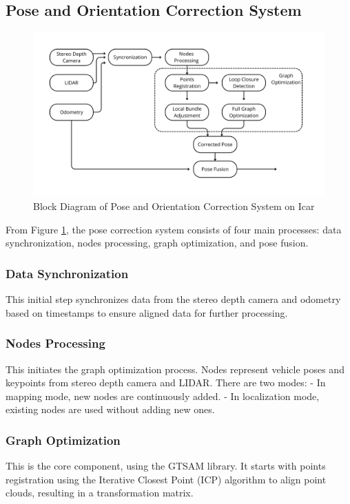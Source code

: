 \documentclass[conference]{IEEEtran}
\begin{document}
\subsection{Pose and Orientation Correction System}
\begin{figure}[H]
	\centering
	\includegraphics[width=\linewidth]{../konten/slam_sys3.png}
	\caption{Block Diagram of Pose and Orientation Correction System on Icar}
	\label{fig:slam_system}
\end{figure} 

From Figure \ref{fig:slam_system}, the pose correction system consists of four main processes: data synchronization, nodes processing, graph optimization, and pose fusion.

\subsubsection{Data Synchronization} 
This initial step synchronizes data from the stereo depth camera and odometry based on timestamps to ensure aligned data for further processing.

\subsubsection{Nodes Processing}
This initiates the graph optimization process. Nodes represent vehicle poses and keypoints from stereo depth camera and LIDAR. There are two modes:
- In mapping mode, new nodes are continuously added.
- In localization mode, existing nodes are used without adding new ones.

\subsubsection{Graph Optimization} 
This is the core component, using the GTSAM library. It starts with points registration using the Iterative Closest Point (ICP) algorithm to align point clouds, resulting in a transformation matrix.
\end{document}
